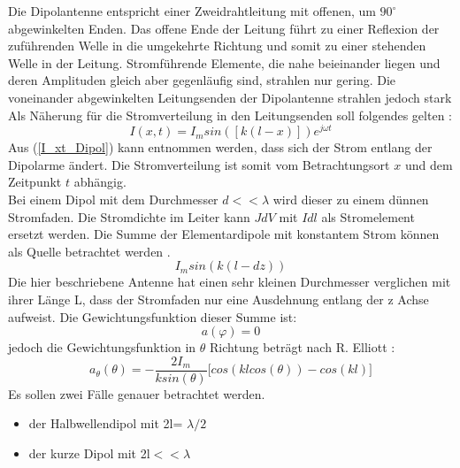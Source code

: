 Die Dipolantenne entspricht einer Zweidrahtleitung mit offenen, um $90^\circ$ abgewinkelten Enden. Das offene Ende der Leitung führt zu einer Reflexion der zuführenden Welle in die umgekehrte Richtung und somit zu einer stehenden Welle in der Leitung. Stromführende Elemente, die nahe beieinander liegen und deren Amplituden gleich aber gegenläufig sind, strahlen nur gering. Die voneinander abgewinkelten Leitungsenden der Dipolantenne strahlen jedoch stark
Als Näherung für die Stromverteilung in den Leitungsenden soll folgendes gelten \cite{elliott1981antenna}:
\begin{equation}\label{I_xt_Dipol} 
I(x,t) =I_{m}sin([k(l-x)])e^{j\omega t}
\end{equation}
Aus  (\ref{I_xt_Dipol}) kann entnommen werden, dass sich der Strom entlang der Dipolarme ändert. Die Stromverteilung ist somit vom Betrachtungsort $x$ und dem Zeitpunkt $t$ abhängig.\\
Bei einem Dipol mit dem Durchmesser $d<<\lambda$ wird dieser zu einem dünnen Stromfaden. Die Stromdichte im Leiter kann $J \textit{d}V$ mit $I\textit{d}l$ als Stromelement ersetzt werden. Die Summe der Elementardipole mit konstantem Strom können als Quelle betrachtet werden \cite{elliott1981antenna}.\\

\begin{equation}
I_{m}sin(k(l-dz))
\end{equation}
Die hier beschriebene Antenne hat einen sehr kleinen Durchmesser verglichen mit ihrer Länge L, dass der Stromfaden nur eine Ausdehnung entlang der z Achse aufweist. Die Gewichtungsfunktion dieser Summe ist:
\begin{equation}
a(\varphi)= 0
\end{equation}
jedoch die Gewichtungsfunktion in $\theta$ Richtung beträgt nach R. Elliott \cite{elliott1981antenna}:
\begin{equation}\label{eq:Gewichtungsfunktion}
a_{\theta}(\theta)=- \frac{2I_{m}}{k sin(\theta)} \Big\lbrack cos(kl cos(\theta)) - cos(kl) \Big\rbrack
\end{equation}
Es sollen zwei Fälle genauer betrachtet werden.
\begin{itemize}
\item der Halbwellendipol mit 2l= $\lambda/2$
\item der kurze Dipol mit 2l$<<\lambda$
\end{itemize}
